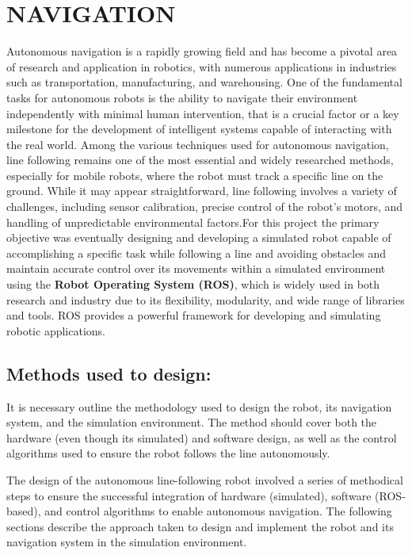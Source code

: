\documentclass[../../main]{subfiles}
\begin{document}
\chapter{NAVIGATION}
    Autonomous navigation is a rapidly growing field and has become a
    pivotal area of research and application in robotics, with numerous
    applications in industries such as transportation, manufacturing, and
    warehousing. One of the fundamental tasks for autonomous robots is the
    ability to navigate their environment independently with minimal human
    intervention, that is a crucial factor or a key milestone for the
    development of intelligent systems capable of interacting with the real
    world. Among the various techniques used for autonomous navigation, line
    following remains one of the most essential and widely researched
    methods, especially for mobile robots, where the robot must track a
    specific line on the ground. While it may appear straightforward, line
    following involves a variety of challenges, including sensor
    calibration, precise control of the robot's motors, and handling of
    unpredictable environmental factors.For this project the primary
    objective was eventually designing and developing a simulated robot
    capable of accomplishing a specific task while following a line and
    avoiding obstacles and maintain accurate control over its movements
    within a simulated environment using the \textbf{Robot Operating System
    (ROS)}, which is widely used in both research and industry due to its
    flexibility, modularity, and wide range of libraries and tools. ROS
    provides a powerful framework for developing and simulating robotic
    applications.
    
    
    \section*{Methods used to design:}

    
    It is necessary outline the methodology used to design the robot, its
    navigation system, and the simulation environment. The method should
    cover both the hardware (even though it\textquotesingle s simulated) and
    software design, as well as the control algorithms used to ensure the
    robot follows the line autonomously.
    
    The design of the autonomous line-following robot involved a series of
    methodical steps to ensure the successful integration of hardware
    (simulated), software (ROS-based), and control algorithms to enable
    autonomous navigation. The following sections describe the approach
    taken to design and implement the robot and its navigation system in the
    simulation environment.
    
\end{document}
